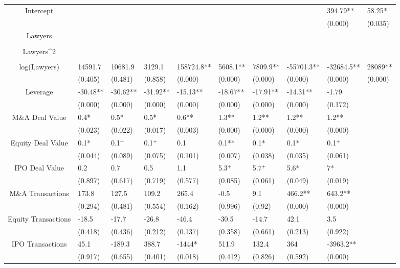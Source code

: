 \documentclass{article}
\begin{document}
\begin{table}[H]
\begin{tabular}{|clllllllll|}
Intercept &  &  &  &  &  &  &  & 394.79** & 58.25* \\ 
   &  &  &  &  &  &  &  & (0.000) & (0.035) \\ 
  Lawyers &  &  &  &  &  &  &  &  &  \\ 
   &  &  &  &  &  &  &  &  &  \\ 
  Lawyers^2 &  &  &  &  &  &  &  &  &  \\ 
   &  &  &  &  &  &  &  &  &  \\ 
  log(Lawyers) & 14591.7 & 10681.9 & 3129.1 & 158724.8** & 5608.1** & 7809.9** & -55701.3** & -32684.5** & 28089** \\ 
   & (0.405) & (0.481) & (0.858) & (0.000) & (0.000) & (0.000) & (0.000) & (0.000) & (0.000) \\ 
  Leverage & -30.48** & -30.62** & -31.92** & -15.13** & -18.67** & -17.91** & -14.31** & -1.79 &  \\ 
   & (0.000) & (0.000) & (0.000) & (0.000) & (0.000) & (0.000) & (0.000) & (0.172) &  \\ 
  M\&A Deal Value & 0.4* & 0.5* & 0.5* & 0.6** & 1.3** & 1.2** & 1.2** & 1.2** &  \\ 
   & (0.023) & (0.022) & (0.017) & (0.003) & (0.000) & (0.000) & (0.000) & (0.000) &  \\ 
  Equity Deal Value & 0.1* & 0.1$^{+}$ & 0.1$^{+}$ & 0.1 & 0.1** & 0.1* & 0.1* & 0.1$^{+}$ &  \\ 
   & (0.044) & (0.089) & (0.075) & (0.101) & (0.007) & (0.038) & (0.035) & (0.061) &  \\ 
  IPO Deal Value & 0.2 & 0.7 & 0.5 & 1.1 & 5.3$^{+}$ & 5.7$^{+}$ & 5.6* & 7* &  \\ 
   & (0.897) & (0.617) & (0.719) & (0.577) & (0.085) & (0.061) & (0.049) & (0.019) &  \\ 
  M\&A Transactions & 173.8 & 127.5 & 109.2 & 265.4 & -0.5 & 9.1 & 466.2** & 643.2** &  \\ 
   & (0.294) & (0.481) & (0.554) & (0.162) & (0.996) & (0.92) & (0.000) & (0.000) &  \\ 
  Equity Transactions & -18.5 & -17.7 & -26.8 & -46.4 & -30.5 & -14.7 & 42.1 & 3.5 &  \\ 
   & (0.418) & (0.436) & (0.212) & (0.137) & (0.358) & (0.661) & (0.213) & (0.922) &  \\ 
  IPO Transactions & 45.1 & -189.3 & 388.7 & -1444* & 511.9 & 132.4 & 364 & -3963.2** &  \\ 
   & (0.917) & (0.655) & (0.401) & (0.018) & (0.412) & (0.826) & (0.592) & (0.000) &  \\ 

\end{tabular}
\end{table}
\end{document}

